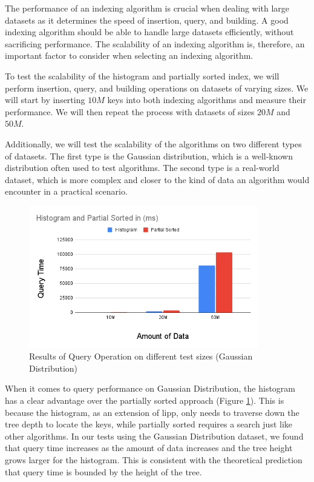 The performance of an indexing algorithm is crucial when dealing with large datasets as it determines the speed of insertion, query, and building. A good indexing algorithm should be able to handle large datasets efficiently, without sacrificing performance. The scalability of an indexing algorithm is, therefore, an important factor to consider when selecting an indexing algorithm.

To test the scalability of the histogram and partially sorted index, we will perform insertion, query, and building operations on datasets of varying sizes. We will start by inserting $10M$ keys into both indexing algorithms and measure their performance. We will then repeat the process with datasets of sizes $20M$ and $50M$.

Additionally, we will test the scalability of the algorithms on two different types of datasets. The first type is the Gaussian distribution, which is a well-known distribution often used to test algorithms. The second type is a real-world dataset, which is more complex and closer to the kind of data an algorithm would encounter in a practical scenario.
\begin{figure}[H]
    \centering
    \includegraphics[width=100mm,scale=1]{Figures/QueryScalability.png}
    \caption{
     Results of Query Operation on different test sizes (Gaussian Distribution)
    }
    \label{fig:QueryScalability}
\end{figure}
When it comes to query performance on Gaussian Distribution, the histogram has a clear advantage over the partially sorted approach (Figure \ref{fig:QueryScalability}). This is because the histogram, as an extension of \acrshort{lipp}, only needs to traverse down the tree depth to locate the keys, while partially sorted requires a search just like other \learnindex algorithms. In our tests using the Gaussian Distribution dataset, we found that query time increases as the amount of data increases and the tree height grows larger for the histogram. This is consistent with the theoretical prediction that query time is bounded by the height of the tree.

